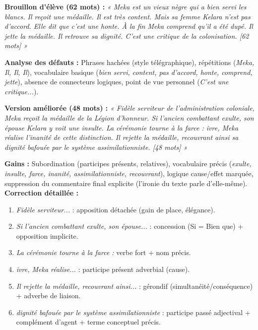 \documentclass[11pt]{article}
\begin{document}
\begin{exoresolu}
\textbf{Brouillon d'élève (62 mots) :}
\emph{« Meka est un vieux nègre qui a bien servi les blancs. Il reçoit une médaille. Il est très content. Mais sa femme Kelara n'est pas d'accord. Elle dit que c'est une honte. À la fin Meka comprend qu'il a été dupé. Il jette la médaille. Il retrouve sa dignité. C'est une critique de la colonisation. [62 mots] »}

\textbf{Analyse des défauts :} Phrases hachées (style télégraphique), répétitions (\emph{Meka, Il, Il, Il}), vocabulaire basique (\emph{bien servi, content, pas d'accord, honte, comprend, jette}), absence de connecteurs logiques, point de vue personnel (\emph{C'est une critique...}).

\textbf{Version améliorée (48 mots) :}
\emph{« Fidèle serviteur de l'administration coloniale, Meka reçoit la médaille de la Légion d'honneur. Si l'ancien combattant exulte, son épouse Kelara y voit une insulte. La cérémonie tourne à la farce : ivre, Meka réalise l'inanité de cette distinction. Il rejette la médaille, recouvrant ainsi sa dignité bafouée par le système assimilationniste. [48 mots] »}

\textbf{Gains :} Subordination (participes présents, relatives), vocabulaire précis (\emph{exulte, insulte, farce, inanité, assimilationniste, recouvrant}), logique cause/effet marquée, suppression du commentaire final explicite (l'ironie du texte parle d'elle-même).
\tcblower
\textbf{Correction détaillée :}
\begin{enumerate}
    \item \emph{Fidèle serviteur...} : apposition détachée (gain de place, élégance).
    \item \emph{Si l'ancien combattant exulte, son épouse...} : concession (Si = Bien que) + opposition implicite.
    \item \emph{La cérémonie tourne à la farce :} verbe fort + nom précis.
    \item \emph{ivre, Meka réalise...} : participe présent adverbial (cause).
    \item \emph{Il rejette la médaille, recouvrant ainsi...} : gérondif (simultanéité/conséquence) + adverbe de liaison.
    \item \emph{dignité bafouée par le système assimilationniste} : participe passé adjectival + complément d'agent + terme conceptuel précis.
\end{enumerate}
\end{exoresolu}
\end{document}

